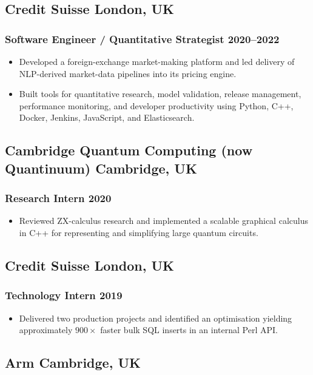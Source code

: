 \documentclass[11pt]{article}
\newcommand{\rside}[1]{\hfill {\normalfont\color{accent} #1}}
\begin{document}
\subsection{Credit Suisse \rside{London, UK}}
\subsubsection{Software Engineer / Quantitative Strategist \rside{2020--2022}}
\begin{itemize}
  \item Developed a foreign-exchange market-making platform and led delivery of NLP-derived market-data pipelines into its pricing engine.
  \item Built tools for quantitative research, model validation, release management, performance monitoring, and developer productivity using Python, C++, Docker, Jenkins, JavaScript, and Elasticsearch.
\end{itemize}

\subsection{Cambridge Quantum Computing (now Quantinuum) \rside{Cambridge, UK}}
\subsubsection{Research Intern \rside{2020}}
\begin{itemize}
  \item Reviewed ZX-calculus research and implemented a scalable graphical calculus in C++ for representing and simplifying large quantum circuits.
\end{itemize}

\subsection{Credit Suisse \rside{London, UK}}
\subsubsection{Technology Intern \rside{2019}}
\begin{itemize}
  \item Delivered two production projects and identified an optimisation yielding approximately $900\times$ faster bulk SQL inserts in an internal Perl API.
\end{itemize}

\subsection{Arm \rside{Cambridge, UK}}
\end{document}
